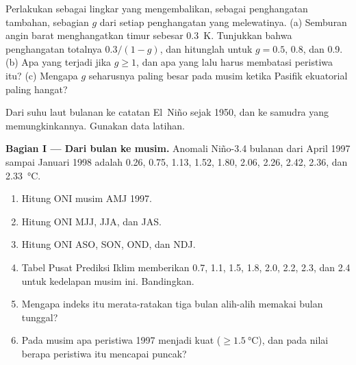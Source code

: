 \begin{exercise}[$\star\star\star$]\label{exo:b2:climate-variability:12}
Perlakukan  sebagai lingkar yang mengembalikan, sebagai penghangatan tambahan, sebagian $g$ dari setiap
penghangatan yang melewatinya. (a) Semburan angin barat menghangatkan timur sebesar \qty{0.3}{K}. Tunjukkan
bahwa penghangatan totalnya $0.3/(1 - g)$, dan hitunglah untuk $g = 0.5$, 0.8, dan 0.9. (b) Apa yang
terjadi jika $g \geq 1$, dan apa yang lalu harus membatasi peristiwa itu? (c) Mengapa $g$ seharusnya paling besar pada
musim ketika Pasifik ekuatorial paling hangat?
\end{exercise}

\begin{problem}\label{pb:b2:climate-variability:1}
Dari suhu laut bulanan ke catatan El~Niño sejak 1950, dan ke samudra yang memungkinkannya.
Gunakan data latihan.

\medskip\noindent\textbf{Bagian I --- Dari bulan ke musim.}
Anomali Niño-3.4 bulanan dari April 1997 sampai Januari 1998 adalah 0.26, 0.75, 1.13, 1.52, 1.80,
2.06, 2.26, 2.42, 2.36, dan \qty{2.33}{\celsius}.
\begin{enumerate}
  \item Hitung ONI musim AMJ 1997.
  \item Hitung ONI MJJ, JJA, dan JAS.
  \item Hitung ONI ASO, SON, OND, dan NDJ.
  \item Tabel Pusat Prediksi Iklim memberikan 0.7, 1.1, 1.5, 1.8, 2.0, 2.2, 2.3, dan
        2.4 untuk kedelapan musim ini. Bandingkan.
  \item Mengapa indeks itu merata-ratakan tiga bulan alih-alih memakai bulan tunggal?
  \item Pada musim apa peristiwa 1997 menjadi kuat ($\geq \qty{1.5}{\celsius}$), dan pada
        nilai berapa peristiwa itu mencapai puncak?
\end{enumerate}


\end{problem}
